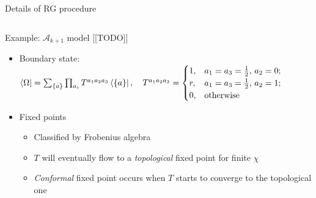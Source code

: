 \documentclass{fdubeamer}
\newcommand{\1}{\mathbb{1}}
\begin{document}
\begin{frame}{Details of RG procedure}
\begin{columns}[c]
\end{columns}


\end{frame}

\begin{frame}{Example: \texorpdfstring{$\mathcal{A}_{k+1}$}{𝒜ₖ₊₁} model [[TODO]]}

\begin{itemize}
  \item Boundary state: \\
    \begingroup
      \scriptsize
      \mbox{\qquad}
      $
        \bra{\Omega} = \sum_{\{a\}} \prod_{a_i} T^{a_1 a_2 a_3} \bra{\{a\}}, \quad 
        T^{a_1 a_2 a_3} = \begin{cases}
          1, & a_1 = a_3 = \frac12, \, a_2 = 0; \\
          r, & a_1 = a_3 = \frac12, \, a_2 = 1; \\
          0, & \mathrm{otherwise}
        \end{cases}
      $
    \endgroup

  \item Fixed points

    \begin{itemize}
      \item Classified by Frobenius algebra
      \item $T$ will eventually flow to a \emph{topological} fixed point for finite $\chi$
      \item \emph{Conformal} fixed point occurs when $T$ starts to converge to the topological one
    \end{itemize}
\end{itemize}

\end{frame}
\end{document}
